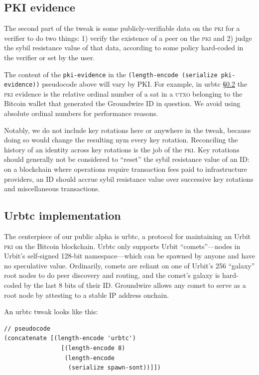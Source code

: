 \documentclass[twoside]{article}
\begin{document}
\subsection[\textsc{pki} evidence]{PKI evidence}\label{pki-evidence}

The second part of the tweak is some publicly-verifiable data on the \textsc{pki}
for a verifier to do two things: 1) verify the existence of a peer on
the \textsc{pki} and 2) judge the sybil resistance value of that data, according
to some policy hard-coded in the verifier or set by the user.

The content of the \texttt{pki-evidence} in the
\texttt{(length-encode\ (serialize\ pki-evidence))} pseudocode above will vary by PKI.
For example, in urbtc \S\ref{urbtc-implementation} the \textsc{pki} evidence is the
relative ordinal number \citep{Rodarmor2022Ordinals} of a sat
in a \textsc{utxo} belonging to the Bitcoin wallet that generated the Groundwire
ID in question. We avoid using absolute ordinal numbers for performance
reasons.

Notably, we do not include key rotations here or anywhere in the tweak,
because doing so would change the resulting nym every key rotation.
Reconciling the history of an identity across key rotations is the job
of the \textsc{pki}. Key rotations should generally not be considered to
``reset'' the sybil resistance value of an ID: on a blockchain where
operations require transaction fees paid to infrastructure providers, an
ID should accrue sybil resistance value over successive key rotations
and miscellaneous transactions.

\subsection{Urbtc implementation}\label{urbtc-implementation}

\sloppy
The centerpiece of our public alpha is urbtc, a protocol for maintaining
an Urbit \textsc{pki} on the Bitcoin blockchain. Urbtc only supports Urbit
``comets''---nodes in Urbit's self-signed 128-bit namespace---which
can be spawned by anyone and have no speculative value. Ordinarily,
comets are reliant on one of \mbox{Urbit's} 256 ``galaxy'' root nodes to do
peer discovery and routing, and the comet's galaxy is hard-coded by the
last 8 bits of their ID. Groundwire allows any comet to serve as a root
node by attesting to a stable IP address onchain.

An urbtc tweak looks like this:

\begin{lstlisting}[style=listingblock]
// pseudocode
(concatenate [(length-encode 'urbtc')
                [(length-encode 8)
                 (length-encode
                  (serialize spawn-sont))]])
\end{lstlisting}
\end{document}
